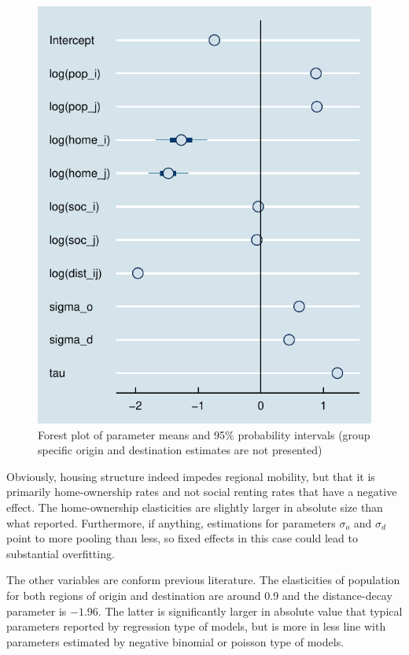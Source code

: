 \documentclass[fleqn,10pt]{SelfArx} %
\begin{document}
{{\begin{figure}
  \includegraphics[width = \columnwidth]{../fig/forestplot.pdf}
  \caption{Forest plot of parameter means and 95\% probability
    intervals (group specific origin and destination estimates are not
    presented)}
  \label{fig:forestplot}
\end{figure}

Obviously, housing structure indeed impedes regional mobility, but that it is primarily 
home-ownership rates and not social renting rates that have a negative
effect. The home-ownership elasticities are slightly larger in absolute
size than what \citet{amirault2016drags} reported. Furthermore, if anything, 
estimations for parameters $\sigma_o$ and $\sigma_d$ point to more
pooling than less, so fixed effects in this case could lead to
substantial overfitting. 

The other variables are conform previous literature. The elasticities of population for both regions of origin and destination are around 0.9 and the distance-decay parameter is $-1.96$. The latter is significantly larger in absolute value that typical parameters reported by regression type of models, but is more in less line with parameters estimated by negative binomial or poisson type of models. 

}}
\end{document}
